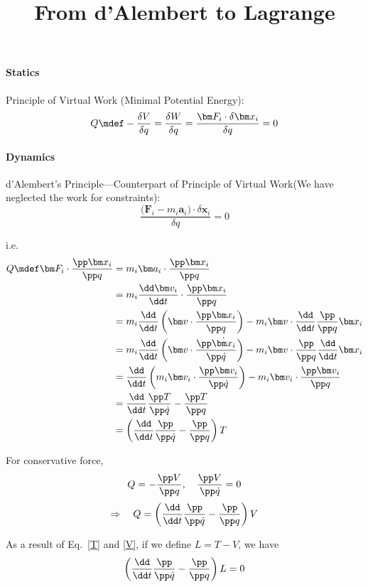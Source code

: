 \documentclass[12pt]{article}
\title{From d'Alembert to Lagrange}
\author{\zpj}
\begin{document}
\maketitle
\paragraph{Statics}
Principle of Virtual Work (Minimal Potential Energy):
\[Q\mdef-\frac{\delta V}{\delta q}=\frac{\delta W}{\delta q}=\frac{\bm F_i\cdot\delta \bm x_i}{\delta q}=0\]

\paragraph{Dynamics}

d'Alembert's Principle---Counterpart of Principle of Virtual Work(We have neglected the work for constraints):
\[\frac{\bm (\bm F_i-m_i\bm a_i)\cdot\delta \bm x_i}{\delta q}=0\]

i.e. 
\begin{align}
Q\mdef\bm F_i\cdot\frac{\pp \bm x_i}{\pp q}&=m_i\bm a_i\cdot\frac{\pp \bm x_i}{\pp q}\\
&=m_i\frac{\dd \bm v_i}{\dd t}\cdot\frac{\pp \bm x_i}{\pp q}\\
&=m_i\frac{\dd}{\dd t}\left( \bm v\cdot\frac{\pp \bm x_i}{\pp q}\right)-m_i\bm v\cdot\frac{\dd}{\dd t}\frac{\pp}{\pp q}\bm x_i\\
&=m_i\frac{\dd}{\dd t}\left(\bm v\cdot\frac{\pp \dot{\bm x_i}}{\pp\dot q}\right)-m_i\bm v\cdot\frac{\pp}{\pp q}\frac{\dd}{\dd t}\bm x_i\\
&=\frac{\dd}{\dd t}\left(m_i\bm v_i\cdot\frac{\pp\bm v_i}{\pp\dot q}\right)-m_i\bm v_i\cdot\frac{\pp \bm v_i}{\pp q}\\
&=\frac{\dd}{\dd t}\frac{\pp T}{\pp\dot q}-\frac{\pp T}{\pp q}\\
&=\left(\frac{\dd}{\dd t}\frac{\pp}{\pp\dot q}-\frac{\pp}{\pp q}\right)T\label{T}
\end{align}

For conservative force,
\[Q=-\frac{\pp V}{\pp q},\quad \frac{\pp V}{\pp \dot q}=0\]
\begin{equation}
\Rightarrow\quad Q=\left(\frac{\dd}{\dd t}\frac{\pp}{\pp\dot q}-\frac{\pp}{\pp q}\right)V\label{V}
\end{equation}

As a result of Eq.~\ref{T} and \ref{V}, if we define $L=T-V$, we have
\[\left(\frac{\dd}{\dd t}\frac{\pp}{\pp\dot q}-\frac{\pp}{\pp q}\right)L=0\]
\end{document}
